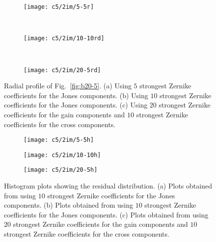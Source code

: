 \begin{figure}[H] 
  \centering
     \begin{subfigure}[b]{\columnwidth} %
                \texttt{[image: c5/2im/5-5r]}
                \caption{}
                \label{fig:A5a}
        \end{subfigure} \\ %
        \begin{subfigure}[b]{\columnwidth}%
                \texttt{[image: c5/2im/10-10rd]}
                \caption{}
               \label{fig:A5b}
        \end{subfigure}\\ %
        \begin{subfigure}[b]{\columnwidth}%
                \texttt{[image: c5/2im/20-5rd]}
                \caption{}
               \label{fig:A5c}
        \end{subfigure}
        
        \caption{Radial profile of Fig.~\ref{fig:b20-5}. (a) Using $5$ strongest Zernike coefficients for the Jones components.  
        (b) Using $10$ strongest Zernike coefficients for the Jones components.
        (c) Using $20$ strongest Zernike coefficients for the gain components and $10$ strongest Zernike coefficients for the cross components.}
	     \label{fig:3rad}
  \end{figure}
  \FloatBarrier
 
\begin{figure}[H]
  \centering
     \begin{subfigure}{\columnwidth}
                \texttt{[image: c5/2im/5-5h]}
                \caption{}
                \label{fig:A10a}
        \end{subfigure} \hfill
        \begin{subfigure}{\columnwidth}
                \texttt{[image: c5/2im/10-10h]}
                \caption{}
               \label{fig:A10b}
        \end{subfigure} \hfill
        \begin{subfigure}{\columnwidth}
                \texttt{[image: c5/2im/20-5h]}
                \caption{}
               \label{fig:A10c}
        \end{subfigure}
        
        \caption{Histogram plots showing the residual distribution. (a) Plots obtained from using $10$ strongest Zernike coefficients for the Jones components.
        (b) Plots obtained from using $10$ strongest Zernike coefficients for the Jones components.
        (c) Plots obtained from using $20$ strongest Zernike coefficients for the gain components and $10$ strongest Zernike coefficients for the cross components.
	    }
	    \label{fig:3hist}
  \end{figure}
  \FloatBarrier

